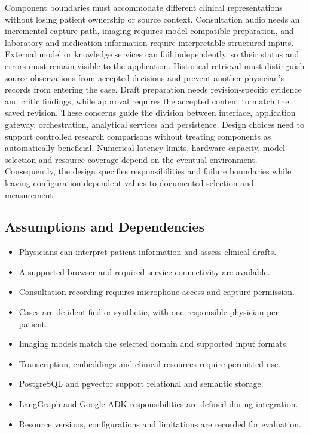 Component boundaries must accommodate different clinical representations without losing patient ownership or source context. Consultation audio needs an incremental capture path, imaging requires model-compatible preparation, and laboratory and medication information require interpretable structured inputs. External model or knowledge services can fail independently, so their status and errors must remain visible to the application. Historical retrieval must distinguish source observations from accepted decisions and prevent another physician's records from entering the case. Draft preparation needs revision-specific evidence and critic findings, while approval requires the accepted content to match the saved revision. These concerns guide the division between interface, application gateway, orchestration, analytical services and persistence. Design choices need to support controlled research comparisons without treating components as automatically beneficial. Numerical latency limits, hardware capacity, model selection and resource coverage depend on the eventual environment. Consequently, the design specifies responsibilities and failure boundaries while leaving configuration-dependent values to documented selection and measurement.

\subsection{Assumptions and Dependencies}

\begin{itemize}
\item Physicians can interpret patient information and assess clinical drafts.
\item A supported browser and required service connectivity are available.
\item Consultation recording requires microphone access and capture permission.
\item Cases are de-identified or synthetic, with one responsible physician per patient.
\item Imaging models match the selected domain and supported input formats.
\item Transcription, embeddings and clinical resources require permitted use.
\item PostgreSQL and pgvector support relational and semantic storage.
\item LangGraph and Google ADK responsibilities are defined during integration.
\item Resource versions, configurations and limitations are recorded for evaluation.
\end{itemize}

